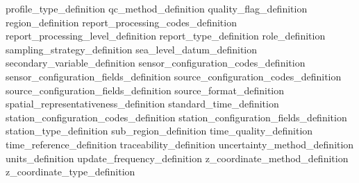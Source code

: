\documentclass[a4paper,12pt]{article}
\begin{document}
 {profile_type_definition} %
 {qc_method_definition}
 {quality_flag_definition} %
 {region_definition} %
 {report_processing_codes_definition} %
 {report_processing_level_definition} %
 {report_type_definition} %
 {role_definition} %
 {sampling_strategy_definition} %
 {sea_level_datum_definition} %
 {secondary_variable_definition} %
 {sensor_configuration_codes_definition} %
 {sensor_configuration_fields_definition} %
 {source_configuration_codes_definition} %
 {source_configuration_fields_definition} %
 {source_format_definition} %
 {spatial_representativeness_definition} %
 {standard_time_definition} %
 {station_configuration_codes_definition} %
 {station_configuration_fields_definition} %
 {station_type_definition} %
 {sub_region_definition} %
 {time_quality_definition} %
 {time_reference_definition} %
 {traceability_definition} %
 {uncertainty_method_definition}
 {units_definition} %
 {update_frequency_definition} %
 {z_coordinate_method_definition} %
 {z_coordinate_type_definition} %


\FloatBarrier
\newpage
\end{document}
